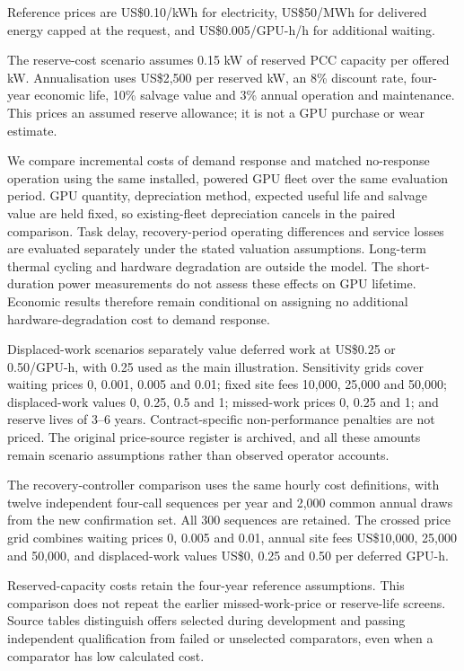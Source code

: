 \documentclass[10pt,a4paper]{article}
\begin{document}
Reference prices are US\$0.10/kWh for electricity, US\$50/MWh for delivered energy capped at the request, and US\$0.005/GPU-h/h for additional waiting.


The reserve-cost scenario assumes 0.15 kW of reserved PCC capacity per offered kW. Annualisation uses US\$2,500 per reserved kW, an 8\% discount rate, four-year economic life, 10\% salvage value and 3\% annual operation and maintenance. This prices an assumed reserve allowance; it is not a GPU purchase or wear estimate.


We compare incremental costs of demand response and matched no-response operation using the same installed, powered GPU fleet over the same evaluation period. GPU quantity, depreciation method, expected useful life and salvage value are held fixed, so existing-fleet depreciation cancels in the paired comparison. Task delay, recovery-period operating differences and service losses are evaluated separately under the stated valuation assumptions. Long-term thermal cycling and hardware degradation are outside the model. The short-duration power measurements do not assess these effects on GPU lifetime. Economic results therefore remain conditional on assigning no additional hardware-degradation cost to demand response.


Displaced-work scenarios separately value deferred work at US\$0.25 or 0.50/GPU-h, with 0.25 used as the main illustration. Sensitivity grids cover waiting prices 0, 0.001, 0.005 and 0.01; fixed site fees 10,000, 25,000 and 50,000; displaced-work values 0, 0.25, 0.5 and 1; missed-work prices 0, 0.25 and 1; and reserve lives of 3–6 years. Contract-specific non-performance penalties are not priced. The original price-source register is archived, and all these amounts remain scenario assumptions rather than observed operator accounts.


The recovery-controller comparison uses the same hourly cost definitions, with twelve independent four-call sequences per year and 2,000 common annual draws from the new confirmation set. All 300 sequences are retained. The crossed price grid combines waiting prices 0, 0.005 and 0.01, annual site fees US\$10,000, 25,000 and 50,000, and displaced-work values US\$0, 0.25 and 0.50 per deferred GPU-h.


Reserved-capacity costs retain the four-year reference assumptions. This comparison does not repeat the earlier missed-work-price or reserve-life screens. Source tables distinguish offers selected during development and passing independent qualification from failed or unselected comparators, even when a comparator has low calculated cost.
\end{document}
